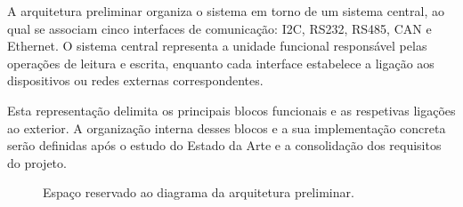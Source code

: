 A arquitetura preliminar organiza o sistema em torno de um sistema
central, ao qual se associam cinco interfaces de comunicação: I2C, RS232,
RS485, CAN e Ethernet. O sistema central representa a unidade funcional
responsável pelas operações de leitura e escrita, enquanto cada interface
estabelece a ligação aos dispositivos ou redes externas correspondentes.

Esta representação delimita os principais blocos funcionais e as
respetivas ligações ao exterior. A organização interna desses blocos e a
sua implementação concreta serão definidas após o estudo do Estado da Arte
e a consolidação dos requisitos do projeto.

\begin{figure}[htbp]
    \centering
    \caption{Espaço reservado ao diagrama da arquitetura preliminar.}
    \label{fig:arquitetura-preliminar}
\end{figure}
